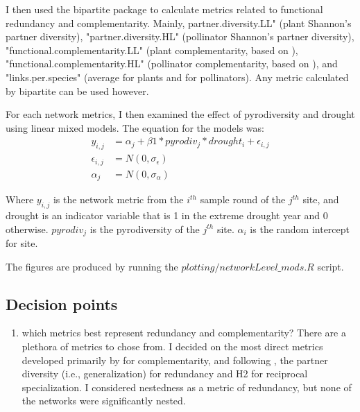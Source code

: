 \documentclass{article}\usepackage[]{graphicx}\usepackage[]{color}
\begin{document}
I then used the bipartite package to calculate metrics related to
functional redundancy and complementarity. Mainly,
partner.diversity.LL" (plant Shannon's partner diversity),
"partner.diversity.HL" (pollinator Shannon's partner diversity),
"functional.complementarity.LL" (plant complementarity, based on
\citep{devoto2012understanding}), "functional.complementarity.HL"
(pollinator complementarity, based on
\citep{devoto2012understanding}), and "links.per.species" (average for
plants and for pollinators). Any metric calculated by bipartite can be
used however.

For each network metrics, I then examined the effect of pyrodiversity and drought using linear mixed models. The  equation for the models was: 
\begin{equation}
\label{equ:metrics}
\begin{aligned}
y_{i,j} & = \alpha_j + \beta1*pyrodiv_j*drought_i + \epsilon_{i,j} \\
\epsilon_{i,j} & = N(0, \sigma_{\epsilon}) \\
\alpha_j & = N(0, \sigma_{\alpha})
\end{aligned}
\end{equation}

Where $y_{i,j}$ is the network metric from the $i^{th}$ sample round
of the $j^{th}$ site, and drought is an indicator variable that is 1
in the extreme drought year and 0 otherwise. $pyrodiv_j$ is the
pyrodiversity of the $j^{th}$ site. $\alpha_i$ is the random
intercept for site.

The figures are produced by running the $plotting/networkLevel\_mods.R$ script.

\subsection{Decision points} 
\label{sec:metrics_dp}
\begin{enumerate}
\item which metrics best represent redundancy and complementarity?
  There are a plethora of metrics to chose from. I decided on the most
  direct metrics developed primarily by \citep{devoto2012understanding} for
  complementarity, and following \cite{kaiser2017ecosystem}, the partner diversity (i.e., generalization) for
  redundancy and H2 for reciprocal specialization. I considered
  nestedness as a metric of redundancy, but none of the networks were
  significantly nested.   
\end{enumerate}
\end{document}
